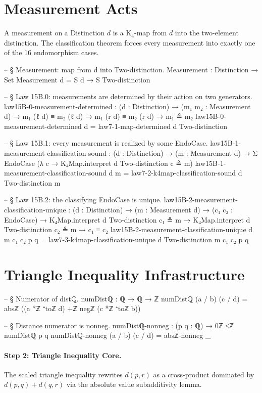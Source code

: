 \documentclass[11pt,a4paper]{book}
\begin{document}
\section{Measurement Acts}

A measurement on a Distinction $d$ is a K$_4$-map from $d$ into the two-element
distinction. The classification theorem forces every measurement into exactly one of
the 16 endomorphism cases.

\begin{code}
-- § Measurement: map from d into Two-distinction.
Measurement : Distinction → Set
Measurement d = S d → S Two-distinction

-- § Law 15B.0: measurements are determined by their action on two generators.
law15B-0-measurement-determined :
  (d : Distinction) →
  (m₁ m₂ : Measurement d) →
  m₁ (ℓ d) ≡ m₂ (ℓ d) →
  m₁ (r d) ≡ m₂ (r d) →
  m₁ ≗ m₂
law15B-0-measurement-determined d =
  law7-1-map-determined d Two-distinction

-- § Law 15B.1: every measurement is realized by some EndoCase.
law15B-1-measurement-classification-sound :
  (d : Distinction) →
  (m : Measurement d) →
  Σ EndoCase (λ c → K₄Map.interpret d Two-distinction c ≗ m)
law15B-1-measurement-classification-sound d m =
  law7-2-k4map-classification-sound d Two-distinction m

-- § Law 15B.2: the classifying EndoCase is unique.
law15B-2-measurement-classification-unique :
  (d : Distinction) →
  (m : Measurement d) →
  (c₁ c₂ : EndoCase) →
  K₄Map.interpret d Two-distinction c₁ ≗ m →
  K₄Map.interpret d Two-distinction c₂ ≗ m →
  c₁ ≡ c₂
law15B-2-measurement-classification-unique d m c₁ c₂ p q =
  law7-3-k4map-classification-unique d Two-distinction m c₁ c₂ p q
\end{code}

\section{Triangle Inequality Infrastructure}

\begin{code}
-- § Numerator of distℚ.
numDistℚ : ℚ → ℚ → ℤ
numDistℚ (a / b) (c / d) = absℤ ((a *ℤ ⁺toℤ d) +ℤ negℤ (c *ℤ ⁺toℤ b))

-- § Distance numerator is nonneg.
numDistℚ-nonneg : (p q : ℚ) → 0ℤ ≤ℤ numDistℚ p q
numDistℚ-nonneg (a / b) (c / d) = absℤ-nonneg _
\end{code}

\paragraph{Step 2: Triangle Inequality Core.}
The scaled triangle inequality rewrites $d(p,r)$
as a cross-product dominated by $d(p,q) + d(q,r)$ via
the absolute value subadditivity lemma.
\end{document}
